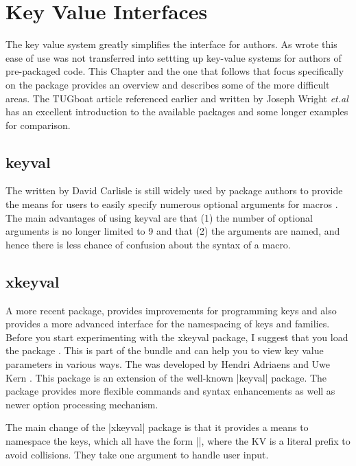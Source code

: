 \chapter{Key Value Interfaces}

The key value system greatly simplifies the \tex interface for authors. As \cite{joseph2009} wrote this ease of use was not transferred into settting up key-value systems for authors of pre-packaged \tex code. This Chapter and the one that follows that focus specifically on the  package provides an overview and describes some of the more difficult areas. The TUGboat article referenced earlier and written by Joseph Wright \textit{et.al} has an excellent introduction to the available packages and some longer examples for comparison.

\section{keyval}

The  written by David Carlisle is still widely used by package authors to provide the means for users to easily specify numerous optional arguments for macros \cite{keyval}. The main advantages of using keyval are that  (1) the number of optional arguments is no longer limited to 9 and that (2) the arguments are named, and hence there is less chance of confusion about the syntax of a macro.

\section{xkeyval}

A more recent package,  provides improvements for programming keys and  also
provides a more advanced interface for the namespacing of keys and families.
Before you start experimenting with the xkeyval package, I suggest that you load the package . This is part of the   bundle and can help you to view key value parameters in various ways. The  was developed by Hendri Adriaens and Uwe Kern \citep{xkeyval}. This package is an extension of the well-known |keyval| package. The package provides more flexible commands and syntax enhancements as well as newer option processing mechanism.

The main change of the |xkeyval| package is that it provides a means to namespace the keys, which all have the form |\KV@family@keyname|, where the KV is a literal prefix to avoid collisions. They take one argument to handle user input.

